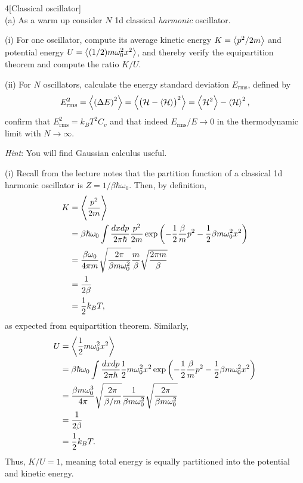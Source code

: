 \documentclass[12pt]{article}
\begin{document}
\begin{problem}{4}[Classical oscillator]~\\
(a) As a warm up consider $N$ 1d classical \textit{harmonic} oscillator.

\qquad(i) For one oscillator, compute its average kinetic energy
$K=\expval{p^2/2m}$ and potential energy $U=\expval{(1/2)m\omega_0^2x^2}$, and
thereby verify the equipartition theorem and compute the ratio $K/U$.

\qquad(ii) For $N$ oscillators, calculate the energy standard deviation
$E_\text{rms}$, defined by
\begin{equation}
    E_\text{rms}^2=\expval{\qty(\Delta E)^2}=\expval{\qty(\mathcal{H}-\expval{\mathcal{H}})^2}
    =\expval{\mathcal{H}^2}-\expval{\mathcal{H}}^2,
\end{equation}
confirm that $E_\text{rms}^2=k_BT^2C_v$ and that indeed $E_\text{rms}/E\to0$ in
the thermodynamic limit with $N\to\infty$.

\textit{Hint}: You will find Gaussian calculus useful.
\begin{solution}
(i) Recall from the lecture notes that the partition function of a classical 1d
harmonic oscillator is $Z=1/\beta\hbar\omega_0$. Then, by definition,
\begin{align}
    K
    &=\expval{\frac{p^2}{2m}}\notag\\
    &=\beta\hbar\omega_0\int\frac{dxdp}{2\pi\hbar}\frac{p^2}{2m}\exp\qty(-\frac12\frac\beta{m}p^2-\frac12\beta
    m\omega_0^2x^2)\notag\\
    &=\frac{\beta\omega_0}{4\pi m}\sqrt{\frac{2\pi}{\beta
        m\omega_0^2}}\frac{m}{\beta}\sqrt{\frac{2\pi m}{\beta}}\notag\\
    &=\frac{1}{2\beta}\notag\\
    &=\frac12k_BT,
\end{align}
as expected from equipartition theorem. Similarly,
\begin{align}
    U
    &=\expval{\frac12m\omega_0^2x^2}\notag\\
    &=\beta\hbar\omega_0\int\frac{dxdp}{2\pi\hbar}\frac12m\omega_0^2x^2
    \exp\qty(-\frac12\frac\beta{m}p^2-\frac12\beta m\omega_0^2x^2)\notag\\
    &=\frac{\beta m\omega_0^3}{4\pi}\sqrt{\frac{2\pi}{\beta/m}}\frac1{\beta
    m\omega_0^2}\sqrt{\frac{2\pi}{\beta m\omega_0^2}}\notag\\
    &=\frac{1}{2\beta}\notag\\
    &=\frac12k_BT.
\end{align}
Thus, $K/U=1$, meaning total energy is equally partitioned into the potential 
and kinetic energy.


\end{solution}
\end{problem}
\end{document}
